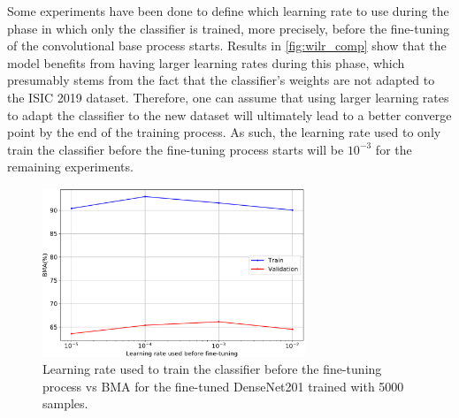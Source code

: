     Some experiments have been done to define which learning rate to use during the phase in which only the classifier is trained, more precisely, before the fine-tuning of the convolutional base process starts. Results in \autoref{fig:wilr_comp} show that the model benefits from having larger learning rates during this phase, which presumably stems from the fact that the classifier's weights are not adapted to the \ac{ISIC} 2019 dataset. Therefore, one can assume that using larger learning rates to adapt the classifier to the new dataset will ultimately lead to a better converge point by the end of the training process. As such, the learning rate used to only train the classifier before the fine-tuning process starts will be $10^{-3}$ for the remaining experiments. \par
    \begin{figure}[ht]
        \centering
        \includegraphics[width=0.7\textwidth]{figs/densenet201_wilr_comp.pdf}
        \caption{Learning rate used to train the classifier before the fine-tuning process vs \ac{BMA} for the fine-tuned DenseNet201 trained with 5000 samples.}
        \label{fig:wilr_comp}
    \end{figure}
    
